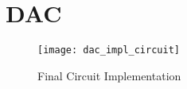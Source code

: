 \graphicspath{{content/4_implementation/figures/}}
\section{DAC}

\begin{figure}[!htb]
  \centering
  \texttt{[image: dac\_impl\_circuit]}
  \caption{Final Circuit Implementation}
\end{figure}